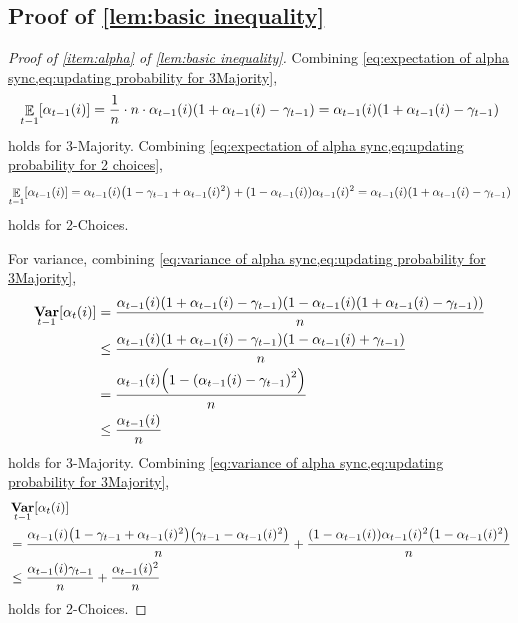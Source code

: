 \documentclass[letterpaper,11pt]{article}
\DeclarePairedDelimiter{\rbra}{\lparen}{\rparen} %
\DeclarePairedDelimiter{\sbra}{\lbrack}{\rbrack} %
\DeclareMathOperator*{\E}{\mathbb{E}}
\DeclareMathOperator*{\Var}{\mathbf{Var}}
\newcommand{\alphanorm}{\gamma}
\newcommand{\opinion}{\mathsf{opn}}
\begin{document}
\subsection{\texorpdfstring{Proof of \cref{lem:basic inequality}}{Proof of basic inequalities}}
\begin{proof}[Proof of \cref{item:alpha} of \cref{lem:basic inequality}]
    Combining \cref{eq:expectation of alpha sync,eq:updating probability for 3Majority},
    \[
    \E_{t-1}\sbra*{\alpha_{t-1}(i)}=\frac{1}{n}\cdot n\cdot \alpha_{t-1}(i)\rbra*{1+\alpha_{t-1}(i)-\alphanorm_{t-1}}=\alpha_{t-1}(i)\rbra*{1+\alpha_{t-1}(i)-\alphanorm_{t-1}}
    \]
    holds for 3-Majority. 
    Combining \cref{eq:expectation of alpha sync,eq:updating probability for 2 choices},
    \[
    \E_{t-1}\sbra*{\alpha_{t-1}(i)}
    =\alpha_{t-1}(i)\rbra*{1-\alphanorm_{t-1}+\alpha_{t-1}(i)^2}
    +\rbra*{1-\alpha_{t-1}(i)}\alpha_{t-1}(i)^2
    =\alpha_{t-1}(i)\rbra*{1+\alpha_{t-1}(i)-\alphanorm_{t-1}}
    \]
    holds for 2-Choices. 

    For variance, combining \cref{eq:variance of alpha sync,eq:updating probability for 3Majority}, 
    \begin{align*}
        \Var_{t-1}[\alpha_t(i)]
        &=\frac{\alpha_{t-1}(i)\rbra*{1+\alpha_{t-1}(i)-\alphanorm_{t-1}}\qty(1-\alpha_{t-1}(i)\rbra*{1+\alpha_{t-1}(i)-\alphanorm_{t-1}})}{n}\\
        &\leq \frac{\alpha_{t-1}(i)\rbra*{1+\alpha_{t-1}(i)-\alphanorm_{t-1}}\qty(1-\alpha_{t-1}(i)+\alphanorm_{t-1})}{n}\\
        &=\frac{\alpha_{t-1}(i)\rbra*{1-\qty(\alpha_{t-1}(i)-\alphanorm_{t-1})^2}}{n}\\
        &\leq \frac{\alpha_{t-1}(i)}{n}
    \end{align*}
    holds for 3-Majority.
    Combining \cref{eq:variance of alpha sync,eq:updating probability for 3Majority}, 
    \begin{align}
        &\Var_{t-1}[\alpha_t(i)] \nonumber \\
        &= \frac{\alpha_{t-1}(i)\rbra*{1-\alphanorm_{t-1}+\alpha_{t-1}(i)^2}\rbra*{\alphanorm_{t-1}-\alpha_{t-1}(i)^2}}{n}
        +\frac{\rbra*{1-\alpha_{t-1}(i)}\alpha_{t-1}(i)^2\rbra*{1-\alpha_{t-1}(i)^2}}{n} \label{eq:var alpha 2}\\
        &\leq \frac{\alpha_{t-1}(i)\alphanorm_{t-1}}{n}
        +\frac{\alpha_{t-1}(i)^2}{n} \nonumber 
    \end{align}
    holds for 2-Choices.
\end{proof}
\end{document}
